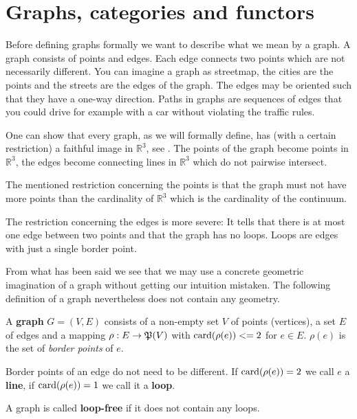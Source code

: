 \section{Graphs, categories and functors}

Before defining graphs formally we want to describe what we mean by a graph. A
graph consists of points and edges. Each edge connects two points which are not
necessarily different. You can imagine a graph as streetmap, the cities are the
points and the streets are the edges of the graph. The edges may be oriented
such that they have a one-way direction. Paths in graphs are sequences of edges
that you could drive for example with a car without violating the traffic rules.

One can show that every graph, as we will formally define, has (with a certain
restriction) a faithful image in $\mathbb{R}^3$, see \cite{Wagner}. The points
of the graph become points in $\mathbb{R}^3$, the edges become connecting lines
in $\mathbb{R}^3$ which do not pairwise intersect.

The mentioned restriction concerning the points is that the graph must not have
more points than the cardinality of $\mathbb{R}^3$ which is the cardinality of
the continuum.

The restriction concerning the edges is more severe: It tells that there is at
most one edge between two points and that the graph has no loops.
Loops are edges with just a single border point.

From what has been said we see that we may use a concrete geometric imagination
of a graph without getting our intuition mistaken. The following definition of a
graph nevertheless does not contain any geometry.

\bigskip
\begin{definition}
A {\bf graph} $G = (V, E)$ consists of a non-empty set $V$ of points
(vertices), a set $E$ of edges and a mapping $\rho: E \to \mathfrak{P}({V})$ with
$\mathrm{card}({\rho(e)}) <= 2$ for $e \in E$. $\rho(e)$ is the set of {\em border points}
of $e$.
\end{definition}

Border points of an edge do not need to be different. If $\mathrm{card}({\rho(e)}) = 2$ we
call $e$ a {\bf line}, if $\mathrm{card}({\rho(e)}) = 1$ we call it a {\bf loop}.

\bigskip
\begin{definition}
A graph is called {\bf loop-free} if it does not contain any loops.
\end{definition}

